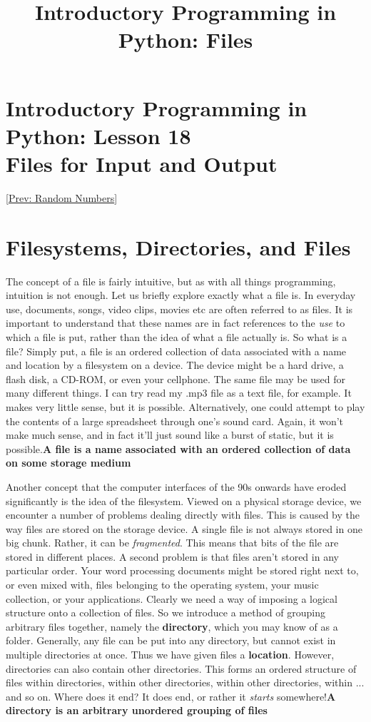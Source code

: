 \documentclass[a4paper,11pt]{article}
\title{Introductory Programming in Python: Files}
\begin{document}
\section{Introductory Programming in Python: Lesson 18
\\    Files for Input and Output}    [\href{random.html}{Prev: Random Numbers}]   

\section{Filesystems, Directories, and Files}

The concept of a file is fairly intuitive, but as with all things   programming, intuition is not enough. Let us briefly explore exactly   what a file is. In everyday use, documents, songs, video clips, movies etc are often referred to as files. It is   important to understand that these names are in fact references to the \textit{use} to which a   file is put, rather than the idea of what a file actually is. So what   is a file?  Simply put, a file is an ordered collection of data   associated with a name and location by a filesystem on a device. The device might be a hard drive, a flash disk, a CD-ROM, or   even your cellphone. The same file may be used for many different   things. I can try read my .mp3 file as a text file, for example. It makes very little   sense, but it is possible. Alternatively, one could attempt to play the   contents of a large spreadsheet through one's sound card. Again, it   won't make much sense, and in fact it'll just sound like a burst of static,   but it is possible.\textbf{A file is a name associated with an ordered collection of data on some storage medium}

Another concept that the computer interfaces of the 90s onwards have eroded   significantly is the idea of the filesystem.       Viewed on a physical storage device, we encounter a number of problems dealing directly with   files. This is caused by the way files are stored on the storage device. A single file is not always stored in one big chunk. Rather, it can be \textit{fragmented}. This means that bits of the file are stored in different places. A second problem is that files aren't stored in any particular order. Your word processing documents might be stored right next to, or even mixed with, files belonging to the operating system, your music   collection, or your applications. Clearly we need a way of imposing a   logical structure onto a collection of files. So we introduce a method   of grouping arbitrary files together, namely the   \textbf{directory}, which you may know of as a folder.   Generally, any file can be put into any directory, but cannot exist in   multiple directories at once. Thus we have given files a   \textbf{location}. However, directories can also contain other   directories. This forms an ordered structure of files within   directories, within other directories, within other directories, within ... and so on.      Where does   it end? It does end, or rather it \textit{starts} somewhere!\textbf{A directory is an arbitrary unordered grouping of files}
\end{document}
